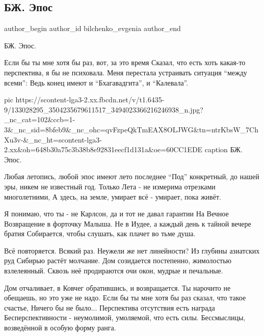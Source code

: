  
 
 
 
 
 
\subsection{БЖ. Эпос}
\label{sec:25_12_2020.fb.bilchenko_evgenia.2.epos}
\ifcmt
 author_begin
   author_id bilchenko_evgenia
 author_end
\fi

БЖ. Эпос.

Если бы ты мне хотя бы раз, вот, за это время
Сказал, что есть хоть какая-то перспектива, я бы не психовала.
Меня перестала устраивать ситуация \enquote{между всеми}:
Ведь конец имеют и \enquote{Бхагавадгита}, и \enquote{Калевала}.

\ifcmt
  pic https://scontent-lga3-2.xx.fbcdn.net/v/t1.6435-9/133028295_3504235679611517_3494023366216246938_n.jpg?_nc_cat=102&ccb=1-3&_nc_sid=8bfeb9&_nc_ohc=qvFzpeQkTmEAX8OLJWG&tn=ntrKbsW_7ChXu3v-&_nc_ht=scontent-lga3-2.xx&oh=648b30a75c3b38b8e92831eecf1d131a&oe=60CC1EDE
	caption БЖ. Эпос.
\fi

Любая летопись, любой эпос имеют лето последнее
\enquote{Под} конкретный, до нашей эры, никем не известный год.
Только Лета - не измерима отрезками многолетними,
А здесь, на земле, умирает всё - умирает, пока живёт.

Я понимаю, что ты - не Карлсон, да и тот не давал гарантии
На Вечное Возвращение в форточку Малыша.
Не в Иудее, а каждый день к тайной вечере братия
Собирается, чтобы слушать, как плачет во тьме душа.

Всё повторяется. Всякий раз. Неужели же нет линейности?
Из глубины азиатских руд Сибирью растёт молчание.
Дом созидается постепенно, жимолостью взлелеянный.
Сквозь неё продираются очи окон, мудрые и печальные.

Дом отчаливает, в Ковчег обратившись, и возвращается.
Ты нарочито не обещаешь, но это уже не надо.
Если бы ты мне хотя бы раз сказал, что такое счастье,
Ничего бы не было... Перспектива отсутствия есть награда
Бесперспективности - неумолимой, умоляемой, что есть силы.
Бессмыслицы, возведённой в особую форму ранга.

